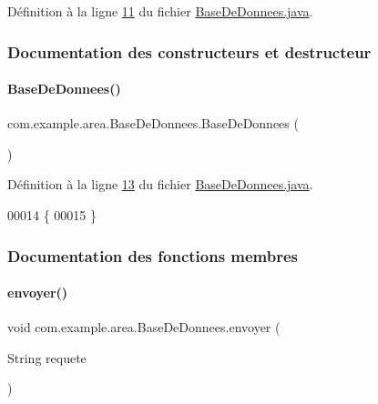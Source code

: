 Définition à la ligne \hyperlink{_base_de_donnees_8java_source_l00011}{11} du fichier \hyperlink{_base_de_donnees_8java_source}{Base\+De\+Donnees.\+java}.



\subsubsection{Documentation des constructeurs et destructeur}
\mbox{\label{classcom_1_1example_1_1area_1_1_base_de_donnees_af9165ddf75f87c6f54c08159b5f791ce}} 
\paragraph{\texorpdfstring{Base\+De\+Donnees()}{BaseDeDonnees()}}
{\footnotesize\ttfamily com.\+example.\+area.\+Base\+De\+Donnees.\+Base\+De\+Donnees (\begin{DoxyParamCaption}{ }\end{DoxyParamCaption})}



Définition à la ligne \hyperlink{_base_de_donnees_8java_source_l00013}{13} du fichier \hyperlink{_base_de_donnees_8java_source}{Base\+De\+Donnees.\+java}.


\begin{DoxyCode}
00014   \{
00015   \}
\end{DoxyCode}


\subsubsection{Documentation des fonctions membres}
\mbox{\label{classcom_1_1example_1_1area_1_1_base_de_donnees_adf1ed72483551ccae7812eec115b9bb7}} 
\paragraph{\texorpdfstring{envoyer()}{envoyer()}}
{\footnotesize\ttfamily void com.\+example.\+area.\+Base\+De\+Donnees.\+envoyer (\begin{DoxyParamCaption}\item[{String}]{requete }\end{DoxyParamCaption})}



